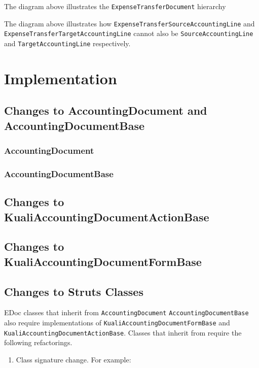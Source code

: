 \documentclass[12pt,notitlepage]{article}
\begin{document}
  The diagram above illustrates the \verb|ExpenseTransferDocument| hierarchy

  The diagram above illustrates how \verb|ExpenseTransferSourceAccountingLine| and \verb|ExpenseTransferTargetAccountingLine|
  cannot also be \verb|SourceAccountingLine| and \verb|TargetAccountingLine| respectively.

  \section{Implementation}
  \subsection{Changes to AccountingDocument and AccountingDocumentBase}
  \subsubsection{AccountingDocument}
  \subsubsection{AccountingDocumentBase}
  \subsection{Changes to KualiAccountingDocumentActionBase}
  \subsection{Changes to KualiAccountingDocumentFormBase}
  \subsection{Changes to Struts Classes}
  EDoc classes that inherit from \verb|AccountingDocument| \verb|AccountingDocumentBase| also require implementations of
  \verb|KualiAccountingDocumentFormBase| and \verb|KualiAccountingDocumentActionBase|. Classes that inherit from require 
  the following refactorings. 
  \begin{enumerate}
    \item Class signature change. For example:

  \end{enumerate}
\end{document}
